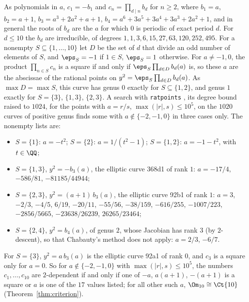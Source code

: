 \begin{remark}
  \label{rem:square-products}
  As polynomials in $a$, $c_1 = -b_1$ and $c_n = \prod_{d \mid n} b_d$ for $n \ge 2$, where
  $b_1 = a$, $b_2 = a + 1$, $b_3 = a^3 + 2a^2 + a + 1$, $b_4 = a^6 + 3a^5 + 3a^4 + 3a^3 + 2a^2 + 1$,
  and in general the roots of $b_d$ are the $a$ for which $0$ is periodic of exact period $d$. For
  $d \le 10$ the $b_d$ are irreducible, of degrees $1, 1, 3, 6, 15, 27, 63, 120, 252, 495$. For a
  nonempty $S \subseteq \{1, \dots, 10\}$ let $D$ be the set of $d$ that divide an odd number of
  elements of $S$, and $\eps_S = -1$ if $1 \in S$, $\eps_S = 1$ otherwise. For $a \ne -1, 0$, the
  product $\prod_{n \in S} c_n$ is a square if and only if $\eps_S \prod_{d \in D} b_d(a)$ is, so
  these $a$ are the abscissae of the rational points on $y^2 = \eps_S \prod_{d \in D} b_d(a)$. As
  $\max D = \max S$, this curve has genus $0$ exactly for $S \subseteq \{1, 2\}$, and genus $1$
  exactly for $S = \{3\}$, $\{1, 3\}$, $\{2, 3\}$. A search with \texttt{ratpoints}
  \cite{ratpoints}, its degree bound raised to $1024$, for the points with $a = r/s$,
  $\max(|r|, s) \le 10^5$, on the $1020$ curves of positive genus finds some with
  $a \notin \{-2, -1, 0\}$ in three cases only. The nonempty lists are:
  \begin{itemize}
    \item $S = \{1\}$: $a = -t^2$; $S = \{2\}$: $a = 1/(t^2 - 1)$; $S = \{1, 2\}$: $a = -1 - t^2$,
          with $t \in \QQ$;
    \item $S = \{1, 3\}$, $y^2 = -b_3(a)$, the elliptic curve 368d1 of rank $1$: $a = -17/4$,
          $-586/81$, $-81185/44944$;
    \item $S = \{2, 3\}$, $y^2 = (a + 1)\,b_3(a)$, the elliptic curve 92b1 of rank $1$: $a = 3$,
          $-2/3$, $-4/5$, $6/19$, $-20/11$, $-55/56$, $-38/159$, $-616/255$, $-1007/223$,
          $-2856/5665$, $-23638/26239$, $26265/23464$;
    \item $S = \{2, 4\}$, $y^2 = b_4(a)$, of genus $2$, whose Jacobian has rank $3$ (by
          $2$-descent), so that Chabauty's method does not apply: $a = 2/3$, $-6/7$.
  \end{itemize}
  For $S = \{3\}$, $y^2 = a\,b_3(a)$ is the elliptic curve 92a1 of rank $0$, and $c_3$ is a square
  only for $a = 0$. So for $a \notin \{-2, -1, 0\}$ with $\max(|r|, s) \le 10^5$, the numbers
  $c_1, \dots, c_{10}$ are $2$-dependent if and only if one of $-a$, $a(a + 1)$, $-(a + 1)$ is a
  square or $a$ is one of the $17$ values listed; for all other such $a$,
  $\Om_{10} \cong \Ct{10}$ (Theorem~\ref{thm:criterion}).
\end{remark}

